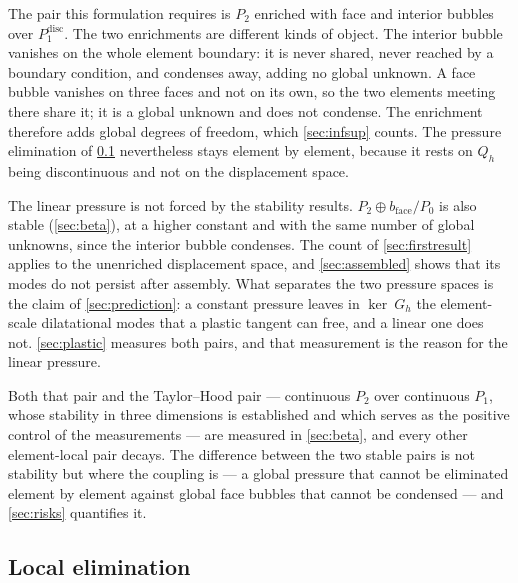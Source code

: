 \documentclass{article}
\theoremstyle{definition}
\theoremstyle{plain}
\begin{document}
The pair this formulation requires is $P_2$ enriched with face and
interior bubbles over $P_1^{\mathrm{disc}}$. The two enrichments are different
kinds of object. The interior bubble vanishes on the whole element boundary: it is never shared,
never reached by a boundary condition, and condenses away, adding no global
unknown. A face bubble vanishes on three faces and not on its own, so the two
elements meeting there share it; it is a global unknown and does not condense.
The enrichment therefore adds global degrees of freedom, which
\cref{sec:infsup} counts. The pressure elimination of \cref{sec:local}
nevertheless stays element by element, because it rests on $Q_h$ being
discontinuous and not on the displacement space.

The linear pressure is not forced by the stability results. $P_2 \oplus
b_{\mathrm{face}}/P_0$ is also stable (\cref{sec:beta}), at a higher constant
and with the same number of global unknowns, since the interior bubble condenses. The count
of \cref{sec:firstresult} applies to the unenriched displacement space, and
\cref{sec:assembled} shows that its modes do not persist after assembly. What
separates the two pressure spaces is the claim of
\cref{sec:prediction}: a constant pressure leaves in $\ker ~G_h$ the
element-scale dilatational modes that a plastic tangent can free, and a linear
one does not. \cref{sec:plastic} measures both pairs, and that measurement
is the reason for the linear pressure.

Both that pair and the Taylor--Hood pair --- continuous $P_2$ over continuous
$P_1$, whose stability in three dimensions is established
\cite{BoffiBrezziFortin:2013} and which serves as the positive control of
the measurements --- are measured in \cref{sec:beta}, and every other
element-local pair decays. The difference between the two stable pairs is not
stability but where the coupling is --- a global pressure that cannot be
eliminated element by element against global face bubbles that cannot be
condensed --- and \cref{sec:risks} quantifies it.

\subsection{Local elimination}
\label{sec:local}
\end{document}
